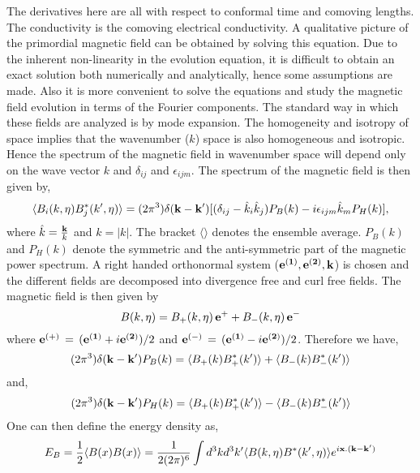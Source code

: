 \documentclass{ws-mpla}
\begin{document}
The derivatives here are all with respect to conformal time and comoving lengths. The conductivity is the comoving electrical conductivity. A qualitative picture of the 
primordial magnetic field can be obtained by solving this equation. Due to the inherent non-linearity in the evolution equation, it is difficult to obtain an exact solution 
both numerically and analytically, hence some assumptions are made. Also it is more convenient to solve the equations and study the magnetic field evolution in terms of the
Fourier components. The standard way in which these fields are analyzed is by mode expansion.  The homogeneity and isotropy of space implies that the wavenumber ($k$) space is also homogeneous and isotropic. Hence the
spectrum of the magnetic field in wavenumber space will depend only on the wave vector $k$ and $\delta_{ij}$ and $\epsilon_{ijm}$. The spectrum of the magnetic field is then given by, 
\begin{equation}
 \langle B_i(k,\eta) B_j^{*} (k',\eta) \rangle = (2 \pi^3) \delta({\bf {k - k'}}) [(\delta_{ij} - \hat k_{i} \hat k_{j}) P_B(k) - i \epsilon_{ijm} \hat k_m P_H(k)], 
\end{equation}
where $\hat k = \frac{\bf k}{k}$ and $k = |k|$. The bracket $\langle \rangle $ denotes the ensemble average. $P_B (k)$ and $P_H (k)$ denote the symmetric and the anti-symmetric 
part of the magnetic power spectrum. A right handed orthonormal system (${\bf e^{(1)}}, {\bf e^{(2)}}, {\bf k}$) is chosen and the different fields are decomposed into divergence free and curl free fields.
The magnetic field is then given by 
\begin{equation}
 B(k, \eta) = B_{+} (k,\eta) \, {\bf e^{+}} +  B_{-} (k,\eta) \, {\bf e^{-}}
\end{equation}
where ${\bf {e^{(+)}}} \, = \, ({\bf {e^{(1)}}} + i {\bf {e^{(2)}}})/2$ and
${\bf {e^{(-)}}} \, = \, ({\bf {e^{(1)}}} - i {\bf {e^{(2)}}})/2$.
Therefore we have, 
\begin{equation}
 (2 \pi^3) \delta({\bf {k - k'}}) P_B(k) = \langle B_{+}(k) B_{+}^{*} (k') \rangle + \langle B_{-}(k) B_{-}^{*} (k') \rangle
\end{equation}
and, 
\begin{equation}
 (2 \pi^3) \delta({\bf {k - k'}}) P_H(k) = \langle B_{+}(k) B_{+}^{*} (k') \rangle - \langle B_{-}(k) B_{-}^{*} (k') \rangle
\end{equation}
One can then define the energy density as, 
\begin{equation}
 E_B = \frac{1}{2} \langle B(x) B(x) \rangle = \frac{1}{2(2\pi)^6} \int {d^3 k d^3 k' \langle B(k,\eta) B^{*}(k',\eta)\rangle e^{i{\bf x}. (\bf k - k')}} 
\end{equation}
\end{document}
